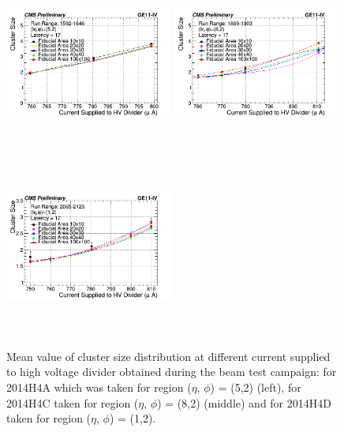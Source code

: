 \begin{figure}[!htbp]
    \begin{center}
      \includegraphics[width=5.5cm,height=6cm]{figures/GEM/CurrentvsClusterSizeR1592R1646.png}%
      \includegraphics[width=5.5cm,height=6cm]{figures/GEM/CurrentvsClusterSizeR1869R1903.png}%
      \includegraphics[width=5.5cm,height=6cm]{figures/GEM/CurrentvsClusterSizeR2065R2123.png}
    \end{center}
    \caption{Mean value of cluster size distribution at different current supplied to high voltage divider obtained during the beam test campaign: for 2014H4A which was taken for region ($\eta$, $\phi$) = (5,2) (left), for 2014H4C taken for region ($\eta$, $\phi$) = (8,2) (middle) and for 2014H4D taken for region ($\eta$, $\phi$) = (1,2).}
  \label{fig:CSDfiducialregion}
\end{figure}
